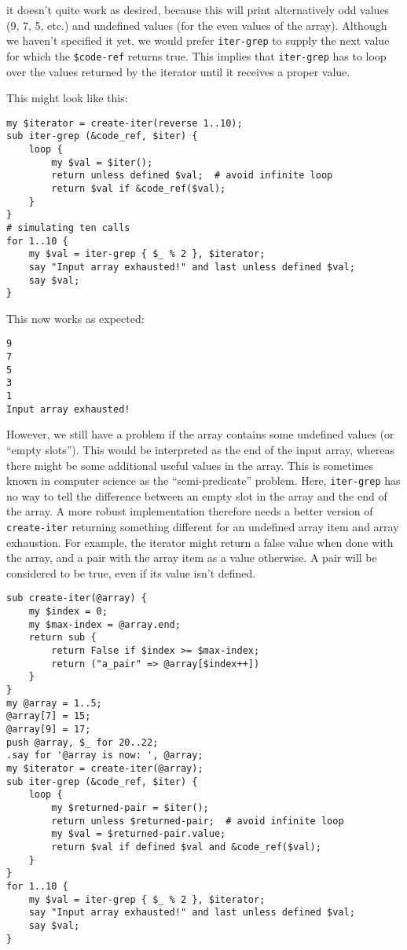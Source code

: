 it doesn't quite work as desired, because this will print 
alternatively odd values (9, 7, 5, etc.) and undefined 
values (for the even values of the array). Although we 
haven't specified it yet, we would prefer {\tt iter-grep} 
to supply the next value for which the \verb'$code-ref' 
returns true. This implies that {\tt iter-grep} has to 
loop over the values returned by the iterator until it 
receives a proper value.

This might look like this:

\begin{verbatim}
my $iterator = create-iter(reverse 1..10);
sub iter-grep (&code_ref, $iter) {
	loop {
		my $val = $iter();
		return unless defined $val;  # avoid infinite loop
	    return $val if &code_ref($val);
	}
}
# simulating ten calls
for 1..10 {
	my $val = iter-grep { $_ % 2 }, $iterator;
	say "Input array exhausted!" and last unless defined $val;
	say $val;
}
\end{verbatim}

This now works as expected:

\begin{verbatim}
9
7
5
3
1
Input array exhausted!
\end{verbatim}

However, we still have a problem if the array 
contains some undefined values (or ``empty slots''). This 
would be interpreted as the end of the input array, whereas 
there might be some additional useful values in the array. 
This is sometimes known in computer science as the 
``semi-predicate'' problem. Here, {\tt iter-grep} has no 
way to tell the difference between an empty slot in the array 
and the end of the array. A more robust implementation 
therefore needs a better version of {\tt create-iter}  
returning something different for an undefined array item 
and array exhaustion. For example, the iterator might return 
a false value when done with the array, and a pair with the 
array item as a value otherwise. A pair will be considered 
to be true, even if its value isn't defined. 

\begin{verbatim}
sub create-iter(@array) {
    my $index = 0;
    my $max-index = @array.end;
    return sub { 
    	return False if $index >= $max-index; 
        return ("a_pair" => @array[$index++]) 
    }
}
my @array = 1..5;
@array[7] = 15;
@array[9] = 17;
push @array, $_ for 20..22;
.say for '@array is now: ', @array;
my $iterator = create-iter(@array);
sub iter-grep (&code_ref, $iter) {
	loop {
		my $returned-pair = $iter();
		return unless $returned-pair;  # avoid infinite loop
		my $val = $returned-pair.value;
	    return $val if defined $val and &code_ref($val);
	}
}
for 1..10 {
	my $val = iter-grep { $_ % 2 }, $iterator;
	say "Input array exhausted!" and last unless defined $val;
	say $val;
}
\end{verbatim}

